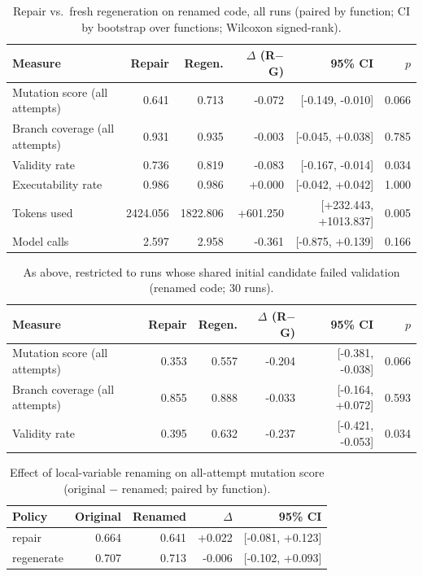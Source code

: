 \begin{table}[t]
\centering\small
\caption{Repair vs.\ fresh regeneration on renamed code, all runs (paired by function; CI by bootstrap over functions; Wilcoxon signed-rank).}
\label{tab:main-renamed}
\begin{tabular}{lrrrrr}
\toprule
Measure & Repair & Regen. & $\Delta$ (R$-$G) & 95\% CI & $p$ \\
\midrule
Mutation score (all attempts) & 0.641 & 0.713 & -0.072 & [-0.149, -0.010] & 0.066 \\
Branch coverage (all attempts) & 0.931 & 0.935 & -0.003 & [-0.045, +0.038] & 0.785 \\
Validity rate & 0.736 & 0.819 & -0.083 & [-0.167, -0.014] & 0.034 \\
Executability rate & 0.986 & 0.986 & +0.000 & [-0.042, +0.042] & 1.000 \\
Tokens used & 2424.056 & 1822.806 & +601.250 & [+232.443, +1013.837] & 0.005 \\
Model calls & 2.597 & 2.958 & -0.361 & [-0.875, +0.139] & 0.166 \\
\bottomrule
\end{tabular}
\end{table}

\begin{table}[t]
\centering\small
\caption{As above, restricted to runs whose shared initial candidate failed validation (renamed code; 30 runs).}
\label{tab:fail-renamed}
\begin{tabular}{lrrrrr}
\toprule
Measure & Repair & Regen. & $\Delta$ (R$-$G) & 95\% CI & $p$ \\
\midrule
Mutation score (all attempts) & 0.353 & 0.557 & -0.204 & [-0.381, -0.038] & 0.066 \\
Branch coverage (all attempts) & 0.855 & 0.888 & -0.033 & [-0.164, +0.072] & 0.593 \\
Validity rate & 0.395 & 0.632 & -0.237 & [-0.421, -0.053] & 0.034 \\
\bottomrule
\end{tabular}
\end{table}

\begin{table}[t]
\centering\small
\caption{Effect of local-variable renaming on all-attempt mutation score (original $-$ renamed; paired by function).}
\label{tab:rename}
\begin{tabular}{lrrrr}
\toprule
Policy & Original & Renamed & $\Delta$ & 95\% CI \\
\midrule
repair & 0.664 & 0.641 & +0.022 & [-0.081, +0.123] \\
regenerate & 0.707 & 0.713 & -0.006 & [-0.102, +0.093] \\
\bottomrule
\end{tabular}
\end{table}

